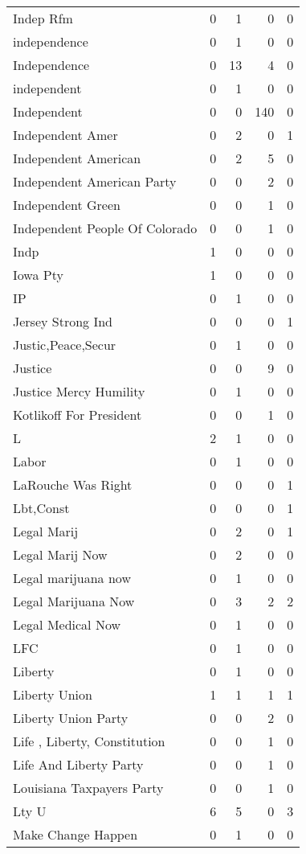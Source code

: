 \begin{supertabular}{lrrrr}
Indep Rfm & 0 & 1 & 0 & 0\\
independence & 0 & 1 & 0 & 0\\
Independence & 0 & 13 & 4 & 0\\
independent & 0 & 1 & 0 & 0\\
Independent & 0 & 0 & 140 & 0\\
Independent Amer & 0 & 2 & 0 & 1\\
Independent American & 0 & 2 & 5 & 0\\
Independent American Party & 0 & 0 & 2 & 0\\
Independent Green & 0 & 0 & 1 & 0\\
Independent People Of Colorado & 0 & 0 & 1 & 0\\
Indp & 1 & 0 & 0 & 0\\
Iowa Pty & 1 & 0 & 0 & 0\\
IP & 0 & 1 & 0 & 0\\
Jersey Strong Ind & 0 & 0 & 0 & 1\\
Justic,Peace,Secur & 0 & 1 & 0 & 0\\
Justice & 0 & 0 & 9 & 0\\
Justice Mercy Humility & 0 & 1 & 0 & 0\\
Kotlikoff For President & 0 & 0 & 1 & 0\\
L & 2 & 1 & 0 & 0\\
Labor & 0 & 1 & 0 & 0\\
LaRouche Was Right & 0 & 0 & 0 & 1\\
Lbt,Const & 0 & 0 & 0 & 1\\
Legal Marij & 0 & 2 & 0 & 1\\
Legal Marij Now & 0 & 2 & 0 & 0\\
Legal marijuana now & 0 & 1 & 0 & 0\\
Legal Marijuana Now & 0 & 3 & 2 & 2\\
Legal Medical Now & 0 & 1 & 0 & 0\\
LFC & 0 & 1 & 0 & 0\\
Liberty & 0 & 1 & 0 & 0\\
Liberty Union & 1 & 1 & 1 & 1\\
Liberty Union Party & 0 & 0 & 2 & 0\\
Life , Liberty, Constitution & 0 & 0 & 1 & 0\\
Life And Liberty Party & 0 & 0 & 1 & 0\\
Louisiana Taxpayers Party & 0 & 0 & 1 & 0\\
Lty U & 6 & 5 & 0 & 3\\
Make Change Happen & 0 & 1 & 0 & 0\\

\end{supertabular}
